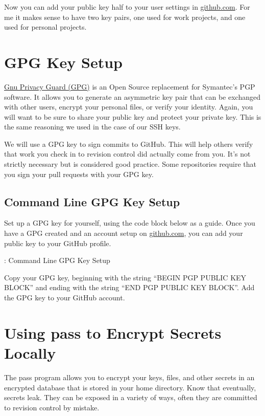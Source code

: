 \justifying
Now you can add your public key half to your user settings in \href{github.com}{github.com}. For me it makes sense to have
two key pairs, one used for work projects, and one used for personal projects.

\section{GPG Key Setup}

\justifying
\href{https://gnupg.org/}{Gnu Privacy Guard (GPG)} is an Open Source replacement for Symantec's PGP software. It allows you
to generate an asymmetric key pair that can be exchanged with other users, encrypt your personal files, or verify your identity.
Again, you will want to be sure to share your public key and protect your private key. This is the same reasoning we used in the
case of our SSH keys.

\justifying
We will use a GPG key to sign commits to GitHub. This will help others verify that work you check in to revision
control did actually come from you. It's not strictly necessary but is considered good practice.
Some repositories require that you sign your pull requests with your GPG key.

\subsection{Command Line GPG Key Setup}

\justifying
Set up a GPG key for yourself, using the code block below as a guide. Once you have a GPG created and an account setup
on \href{github.com}{github.com}, you can add your public key to your GitHub profile.

\begin{mybox}{\thetcbcounter: Command Line GPG Key Setup}

\end{mybox}

\justifying
Copy your GPG key, beginning with the string ``BEGIN PGP PUBLIC KEY BLOCK'' and ending with the string
``END PGP PUBLIC KEY BLOCK''. Add the GPG key to your GitHub account.

\section{Using pass to Encrypt Secrets Locally}

\justifying
The pass program allows you to encrypt your keys, files, and other secrets in an encrypted database that is
stored in your home directory. Know that eventually, secrets leak. They can be exposed in a variety of ways,
often they are committed to revision control by mistake.

